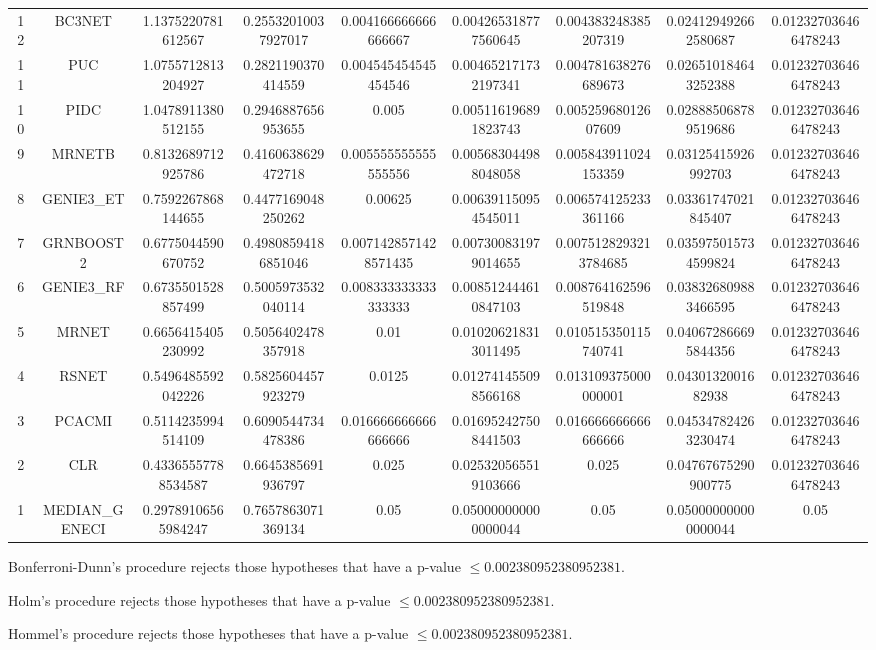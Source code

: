 \documentclass[a4paper,10pt]{article}
\begin{document}
\begin{landscape}
\begin{table}[!htp]
\begin{tabular}{ccccccccc}
12&BC3NET&1.1375220781612567&0.25532010037927017&0.004166666666666667&0.004265318777560645&0.004383248385207319&0.024129492662580687&0.012327036466478243\\
11&PUC&1.0755712813204927&0.2821190370414559&0.004545454545454546&0.004652171732197341&0.004781638276689673&0.026510184643252388&0.012327036466478243\\
10&PIDC&1.0478911380512155&0.2946887656953655&0.005&0.005116196891823743&0.00525968012607609&0.028885068789519686&0.012327036466478243\\
9&MRNETB&0.8132689712925786&0.4160638629472718&0.005555555555555556&0.005683044988048058&0.005843911024153359&0.03125415926992703&0.012327036466478243\\
8&GENIE3_ET&0.7592267868144655&0.4477169048250262&0.00625&0.006391150954545011&0.006574125233361166&0.03361747021845407&0.012327036466478243\\
7&GRNBOOST2&0.6775044590670752&0.49808594186851046&0.0071428571428571435&0.007300831979014655&0.0075128293213784685&0.035975015734599824&0.012327036466478243\\
6&GENIE3_RF&0.6735501528857499&0.5005973532040114&0.008333333333333333&0.008512444610847103&0.008764162596519848&0.038326809883466595&0.012327036466478243\\
5&MRNET&0.6656415405230992&0.5056402478357918&0.01&0.010206218313011495&0.010515350115740741&0.040672866695844356&0.012327036466478243\\
4&RSNET&0.5496485592042226&0.5825604457923279&0.0125&0.012741455098566168&0.013109375000000001&0.0430132001682938&0.012327036466478243\\
3&PCACMI&0.5114235994514109&0.6090544734478386&0.016666666666666666&0.016952427508441503&0.016666666666666666&0.045347824263230474&0.012327036466478243\\
2&CLR&0.43365557788534587&0.6645385691936797&0.025&0.025320565519103666&0.025&0.04767675290900775&0.012327036466478243\\
1&MEDIAN_GENECI&0.29789106565984247&0.7657863071369134&0.05&0.050000000000000044&0.05&0.050000000000000044&0.05\\
\hline
\end{tabular}
\end{table}
Bonferroni-Dunn's procedure rejects those hypotheses that have a p-value $\le0.002380952380952381$.


Holm's procedure rejects those hypotheses that have a p-value $\le0.002380952380952381$.


Hommel's procedure rejects those hypotheses that have a p-value $\le0.002380952380952381$.



\end{landscape}
\end{document}
